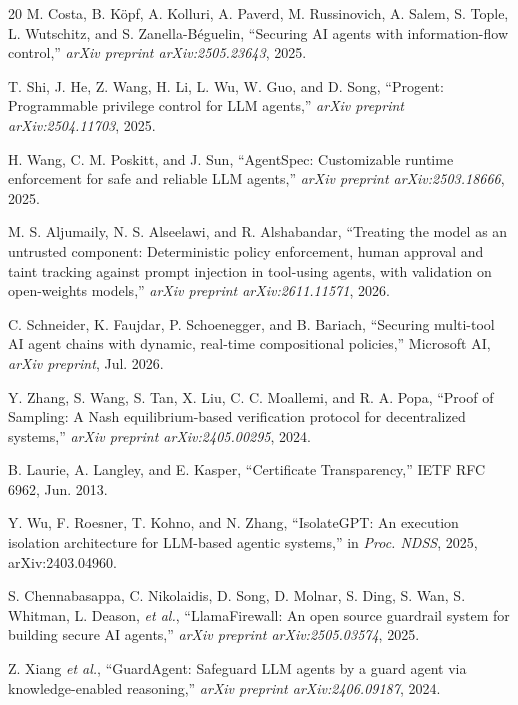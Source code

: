 \documentclass[conference]{IEEEtran}
\begin{document}
\begin{thebibliography}{20}
M. Costa, B. K{\"o}pf, A. Kolluri, A. Paverd, M. Russinovich, A. Salem, S. Tople, L. Wutschitz, and S. Zanella-B{\'e}guelin, ``Securing AI agents with information-flow control,'' \emph{arXiv preprint arXiv:2505.23643}, 2025.

T. Shi, J. He, Z. Wang, H. Li, L. Wu, W. Guo, and D. Song, ``Progent: Programmable privilege control for LLM agents,'' \emph{arXiv preprint arXiv:2504.11703}, 2025.

H. Wang, C. M. Poskitt, and J. Sun, ``AgentSpec: Customizable runtime enforcement for safe and reliable LLM agents,'' \emph{arXiv preprint arXiv:2503.18666}, 2025.

M. S. Aljumaily, N. S. Alseelawi, and R. Alshabandar, ``Treating the model as an untrusted component: Deterministic policy enforcement, human approval and taint tracking against prompt injection in tool-using agents, with validation on open-weights models,'' \emph{arXiv preprint arXiv:2611.11571}, 2026.

C. Schneider, K. Faujdar, P. Schoenegger, and B. Bariach, ``Securing multi-tool AI agent chains with dynamic, real-time compositional policies,'' Microsoft AI, \emph{arXiv preprint}, Jul. 2026.

Y. Zhang, S. Wang, S. Tan, X. Liu, C. C. Moallemi, and R. A. Popa, ``Proof of Sampling: A Nash equilibrium-based verification protocol for decentralized systems,'' \emph{arXiv preprint arXiv:2405.00295}, 2024.

B. Laurie, A. Langley, and E. Kasper, ``Certificate Transparency,'' IETF RFC 6962, Jun. 2013.

Y. Wu, F. Roesner, T. Kohno, and N. Zhang, ``IsolateGPT: An execution isolation architecture for LLM-based agentic systems,'' in \emph{Proc. NDSS}, 2025, arXiv:2403.04960.

S. Chennabasappa, C. Nikolaidis, D. Song, D. Molnar, S. Ding, S. Wan, S. Whitman, L. Deason, \emph{et al.}, ``LlamaFirewall: An open source guardrail system for building secure AI agents,'' \emph{arXiv preprint arXiv:2505.03574}, 2025.

Z. Xiang \emph{et al.}, ``GuardAgent: Safeguard LLM agents by a guard agent via knowledge-enabled reasoning,'' \emph{arXiv preprint arXiv:2406.09187}, 2024.


\end{thebibliography}
\end{document}
